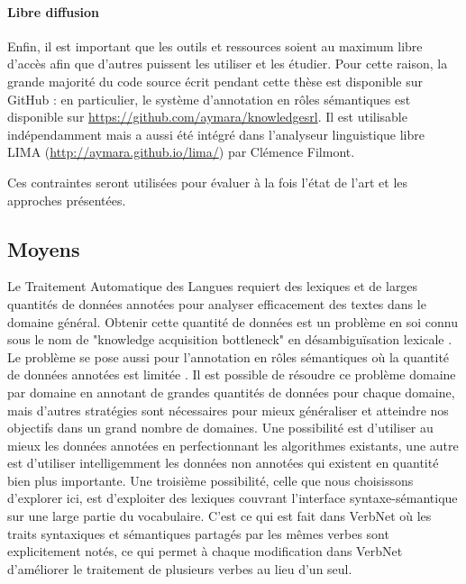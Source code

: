 \paragraph{Libre diffusion} Enfin, il est important que les outils et
ressources soient au maximum libre d'accès afin que d'autres puissent les
utiliser et les étudier. Pour cette raison, la grande majorité du code source
écrit pendant cette thèse est disponible sur GitHub : en particulier, le
système d'annotation en rôles sémantiques est disponible sur
\url{https://github.com/aymara/knowledgesrl}. Il est utilisable indépendamment
mais a aussi été intégré dans l'analyseur linguistique libre LIMA
(\url{http://aymara.github.io/lima/}) par Clémence Filmont.

Ces contraintes seront utilisées pour évaluer à la fois l'état de l'art et les
approches présentées.

\subsection{Moyens}


Le Traitement Automatique des Langues requiert des lexiques et de larges
quantités de données annotées pour analyser efficacement des textes dans le
domaine général. Obtenir cette quantité de données est un problème en soi connu
sous le nom de "knowledge acquisition bottleneck" en désambiguïsation lexicale
\citep{gale1992method,navigli2009word}. Le problème se pose aussi pour
l'annotation en rôles sémantiques où la quantité de données annotées est
limitée \citep[section 1]{das2012structure}. Il est possible de résoudre ce
problème domaine par domaine en annotant de grandes quantités de données pour
chaque domaine, mais d'autres stratégies sont nécessaires pour mieux
généraliser et atteindre nos objectifs dans un grand nombre de domaines. Une
possibilité est d'utiliser au mieux les données annotées en perfectionnant les
algorithmes existants, une autre est d'utiliser intelligemment les données non
annotées qui existent en quantité bien plus importante. Une troisième
possibilité, celle que nous choisissons d'explorer ici, est d'exploiter des
lexiques couvrant l'interface syntaxe-sémantique sur une large partie du
vocabulaire. C'est ce qui est fait dans VerbNet où les traits syntaxiques et
sémantiques partagés par les mêmes verbes sont explicitement notés, ce qui
permet à chaque modification dans VerbNet d'améliorer le traitement de
plusieurs verbes au lieu d'un seul.

